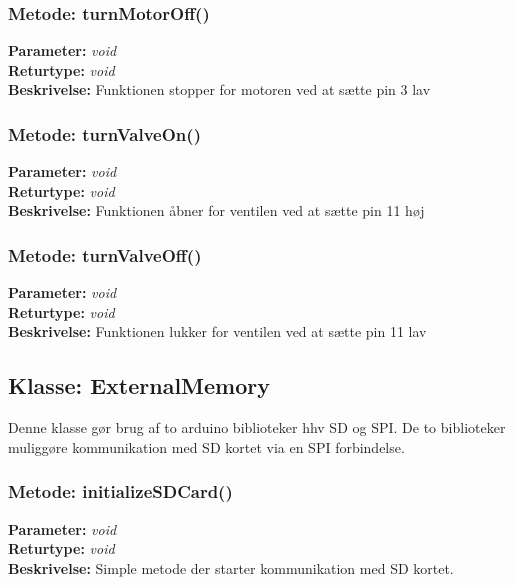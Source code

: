 \subsubsection{Metode: turnMotorOff()}
\textbf{Parameter: } \textit{void}
\\ \textbf{Returtype: } \textit{void}
\\ \textbf{Beskrivelse: }   Funktionen stopper for motoren ved at sætte pin 3 lav

\subsubsection{Metode: turnValveOn()}
\textbf{Parameter: } \textit{void}
\\ \textbf{Returtype: } \textit{void}
\\ \textbf{Beskrivelse: }  Funktionen åbner for ventilen ved at sætte pin 11 høj

\subsubsection{Metode: turnValveOff()}
\textbf{Parameter: } \textit{void}
\\ \textbf{Returtype: } \textit{void}
\\ \textbf{Beskrivelse: }  Funktionen lukker for ventilen ved at sætte pin 11 lav

\subsection{Klasse: ExternalMemory}
Denne klasse gør brug af to arduino biblioteker hhv SD og SPI.  De to biblioteker muliggøre kommunikation med SD kortet via en SPI forbindelse. 

\subsubsection{Metode: initializeSDCard()}
\textbf{Parameter: } \textit{void}
\\ \textbf{Returtype: } \textit{void}
\\ \textbf{Beskrivelse: }  Simple metode der starter kommunikation med SD kortet.

